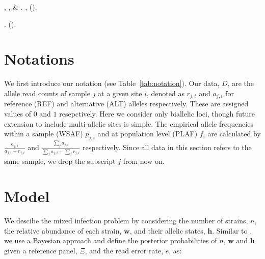 \documentclass{nature}
\newcounter{firstbib}
\begin{document}
\begin{thebibliography}{10}
, ,
   \& 
\newblock {}.
\newblock \emph{} \textbf{},
   ().

\newblock {}.
\newblock \emph{}  ().

\setcounter{firstbib}{\value{enumiv}}

\end{thebibliography}




\newpage

\section*{Notations}

We first introduce our notation (see Table~\ref{tab:notation}). Our data, $D$, are the allele read counts of sample $j$ at a given site $i$, denoted as $r_{j,i}$ and $a_{j,i}$ for reference (REF) and alternative (ALT) alleles respectively.  These are assigned values of $0$ and $1$ resepctively. Here we consider only biallelic loci, though future extension to include multi-allelic sites is simple.  The empirical allele frequencies within a sample (WSAF) $p_{j,i}$ and at population level (PLAF) $f_i$ are calculated by $ \frac{a_{j,i}}{a_{j,i} + r_{j,i}}$ and $ \frac{\sum_j a_{j,i}}{\sum_j a_{j,i} + \sum_j r_{j,i}}$ respectively. Since all data in this section refers to the same sample, we drop the subscript $j$ from now on.


\section*{Model}

We descibe the mixed infection problem by considering the number of strains, $n$, the relative abundance of each strain, $\mathbf{w}$, and their allelic states, $\mathbf{h}$. Similar to \cite{Jack2016}, we use a Bayesian approach and define the posterior probabilities of $n$, $\mathbf{w}$ and $\mathbf{h}$ given a reference panel, $\Xi$, and the read error rate, $e$, as:
\end{document}
